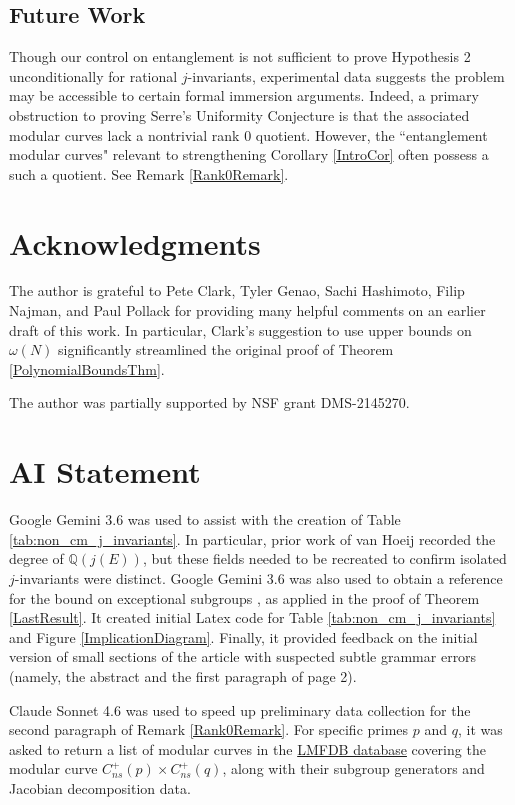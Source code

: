 \documentclass{amsart}
\theoremstyle{definition}
\newcommand{\Q}{\mathbb{Q}}
\begin{document}
\subsection{Future Work} Though our control on entanglement is not sufficient to prove Hypothesis 2 unconditionally for rational $j$-invariants, experimental data suggests the problem may be accessible to certain formal immersion arguments. Indeed, a primary obstruction to proving Serre's Uniformity Conjecture is that the associated modular curves lack a nontrivial rank 0 quotient. However, the ``entanglement modular curves" relevant to strengthening Corollary \ref{IntroCor} often possess a such a quotient. See Remark \ref{Rank0Remark}.

\section*{Acknowledgments}
The author is grateful to Pete Clark, Tyler Genao, Sachi Hashimoto, Filip Najman, and Paul Pollack for providing many helpful comments on an earlier draft of this work. In particular, Clark's suggestion to use upper bounds on $\omega(N)$ significantly streamlined the original proof of Theorem \ref{PolynomialBoundsThm}. 

The author was partially supported by NSF grant DMS-2145270.

\section*{AI Statement}
Google Gemini 3.6 was used to assist with the creation of Table \ref{tab:non_cm_j_invariants}. In particular, prior work of van Hoeij \cite{vanHoeij} recorded the degree of $\Q(j(E))$, but these fields needed to be recreated to confirm isolated $j$-invariants were distinct. Google Gemini 3.6 was also used to obtain a reference for the bound on exceptional subgroups \cite[Remark 2.1]{GhateParent}, as applied in the proof of Theorem \ref{LastResult}. It created initial Latex code for Table \ref{tab:non_cm_j_invariants} and Figure \ref{ImplicationDiagram}. Finally, it provided feedback on the initial version of small sections of the article with suspected subtle grammar errors (namely, the abstract and the first paragraph of page 2). 

Claude Sonnet 4.6 was used to speed up preliminary data collection for the second paragraph of Remark \ref{Rank0Remark}. For specific primes $p$ and $q$, it was asked to return a list of modular curves in the  \href{https://beta.lmfdb.org/ModularCurve/Q/}{LMFDB database} covering the modular curve $C_{ns}^+(p) \times C_{ns}^+(q)$, along with their subgroup generators and Jacobian decomposition data.
\end{document}
